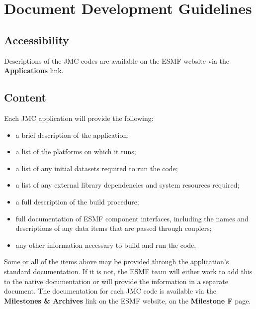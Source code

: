
\section{Document Development Guidelines}
\label{sec:appdocs}

\subsection{Accessibility}

Descriptions of the JMC codes are available on the ESMF website
via the {\bf Applications} link.  

\subsection{Content}

Each JMC application will provide the following:
\begin{itemize}
\item a brief description of the application;
\item a list of the platforms on which it runs;
\item a list of any initial datasets required to run the code;
\item a list of any external library dependencies and system 
      resources required;
\item a full description of the build procedure;
\item full documentation of ESMF component interfaces, including
      the names and descriptions of any data items that are passed
      through couplers;
\item any other information necessary to build and run the 
      code.
\end{itemize}

Some or all of the items above may be provided through the 
application's standard documentation.  If it is not, the ESMF team
will either work to add this to the native documentation or will
provide the information in a separate document.  The documentation
for each JMC code is available via the {\bf Milestones \& Archives} 
link on the ESMF website, on the {\bf Milestone F} page.  




















